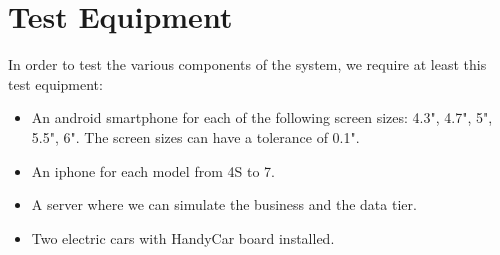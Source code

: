 \section{Test Equipment}
In order to test the various components of the system, we require at least this test equipment:

\begin{itemize}
\item An android smartphone for each of the following screen sizes: 4.3", 4.7", 5", 5.5", 6". The screen sizes can have a tolerance of 0.1".
\item An iphone for each model from 4S to 7.
\item A server where we can simulate the business and the data tier.
\item Two electric cars with HandyCar board installed.
\end{itemize}
